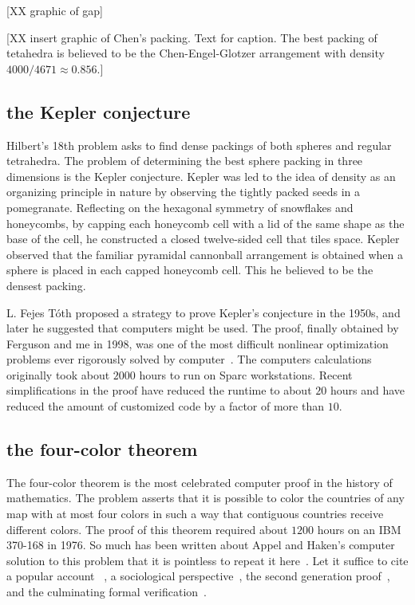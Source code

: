 \documentclass{llncs}
\begin{document}
[XX graphic of gap]

[XX insert graphic of Chen's packing.  Text for caption.  The best packing of
tetahedra is believed to be the Chen-Engel-Glotzer arrangement with density
$4000/4671\approx 0.856$.]

\subsection{the Kepler conjecture}

Hilbert's 18th problem asks to find dense packings of both spheres and regular tetrahedra.
The problem of determining the best sphere packing in three dimensions
is the Kepler conjecture.  Kepler was led to the idea of density as an
organizing principle in nature by observing the tightly packed seeds
in a pomegranate.  Reflecting on the hexagonal symmetry of snowflakes
and honeycombs, by capping each honeycomb cell with a
lid of the same shape as the base of the cell, he constructed a closed twelve-sided cell 
 that tiles space.  Kepler observed that the familiar pyramidal cannonball
arrangement is obtained when a sphere is placed in each capped
honeycomb cell.  This he  believed to be the densest packing.


L. Fejes T\'oth proposed a strategy to prove Kepler's conjecture in
the 1950s, and later he suggested that computers might be used.  The
proof, finally obtained by Ferguson and me in 1998, was one of the
most difficult nonlinear optimization problems ever rigorously solved
by computer~\cite{Hales:2005:Annals}.  The computers calculations
originally took about $2000$ hours to run on Sparc workstations.
Recent simplifications in the proof have reduced the runtime to about
$20$ hours and have reduced the amount of customized code by a factor
of more than $10$.


\subsection{the four-color theorem}

The four-color theorem is the most celebrated computer proof in the
history of mathematics.  The problem asserts that it is possible to
color the countries of any map with at most four colors in such a way
that contiguous countries receive different colors.  The proof of this
theorem required about $1200$ hours on an IBM 370-168 in 1976. So much has
been written about Appel and Haken's computer solution to this problem
that it is pointless to repeat it here~\cite{AH4CT}.  Let it
suffice to cite a popular account ~\cite{Wil4CT}, a sociological
perspective~\cite{Mac}, the second generation
proof~\cite{Robertson:1997:JCTB}, and the culminating formal
verification~\cite{gonthier:2008:formal}.
\end{document}
